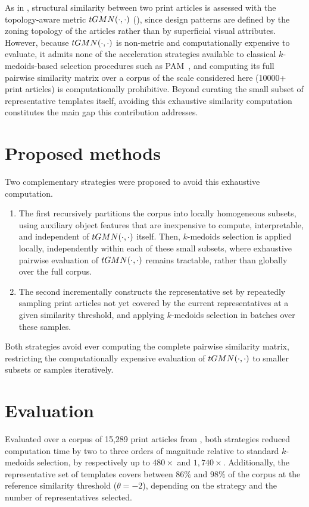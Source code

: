 As in \trs, structural similarity between two print articles is assessed with the topology-aware metric $tGMN(\cdot, \cdot)$ (), since design patterns are defined by the zoning topology of the articles rather than by superficial visual attributes. However, because $tGMN(\cdot, \cdot)$ is non-metric and computationally expensive to evaluate, it admits none of the acceleration strategies available to classical $k$-medoids-based selection procedures such as PAM~\cite{kaufman1987clustering}, and computing its full pairwise similarity matrix over a corpus of the scale considered here (10000+ print articles) is computationally prohibitive. Beyond curating the small subset of representative templates itself, avoiding this exhaustive similarity computation constitutes the main gap this contribution addresses.


\section{Proposed methods}
Two complementary strategies were proposed to avoid this exhaustive computation.

\begin{enumerate}
\item The first recursively partitions the corpus into locally homogeneous subsets, using auxiliary object features that are inexpensive to compute, interpretable, and independent of $tGMN(\cdot, \cdot)$ itself. Then, $k$-medoids selection is  applied locally, independently within each of these small subsets, where exhaustive pairwise evaluation of $tGMN(\cdot, \cdot)$ remains tractable, rather than globally over the full corpus.
\item The second incrementally constructs the representative set by repeatedly sampling print articles not yet covered by the current representatives at a given similarity threshold, and applying $k$-medoids selection in batches over these samples.
\end{enumerate}
Both strategies avoid ever computing the complete pairwise similarity matrix, restricting the computationally expensive evaluation of $tGMN(\cdot, \cdot)$ to  smaller subsets or samples iteratively.

\section{Evaluation}
Evaluated over a corpus of 15,289 print articles from \laprovence, both strategies reduced computation time by two to three orders of magnitude relative to standard $k$-medoids selection, by respectively up to $480\times$ and $1{,}740\times$.
Additionally, the representative set of templates covers between $86\%$ and $98\%$ of the corpus at the reference similarity threshold ($\theta=-2$), depending on the strategy and the number of representatives selected.

